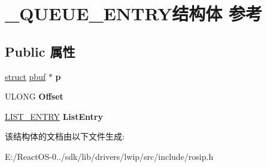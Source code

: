 \hypertarget{struct___q_u_e_u_e___e_n_t_r_y}{}\section{\+\_\+\+Q\+U\+E\+U\+E\+\_\+\+E\+N\+T\+R\+Y结构体 参考}
\label{struct___q_u_e_u_e___e_n_t_r_y}
\subsection*{Public 属性}
\begin{DoxyCompactItemize}
\item 
\mbox{\label{struct___q_u_e_u_e___e_n_t_r_y_a3555067d3e9fa7e84350cc2785de85f9}} 
\hyperlink{interfacestruct}{struct} \hyperlink{structpbuf}{pbuf} $\ast$ {\bfseries p}
\item 
\mbox{\label{struct___q_u_e_u_e___e_n_t_r_y_a94d86ec86e3a67b298d494b66df80737}} 
U\+L\+O\+NG {\bfseries Offset}
\item 
\mbox{\label{struct___q_u_e_u_e___e_n_t_r_y_a365fb2e1815ed43c2ef40bc55b0463a5}} 
\hyperlink{struct___l_i_s_t___e_n_t_r_y}{L\+I\+S\+T\+\_\+\+E\+N\+T\+RY} {\bfseries List\+Entry}
\end{DoxyCompactItemize}


该结构体的文档由以下文件生成\+:\begin{DoxyCompactItemize}
\item 
E\+:/\+React\+O\+S-\/0../sdk/lib/drivers/lwip/src/include/rosip.\+h\end{DoxyCompactItemize}

